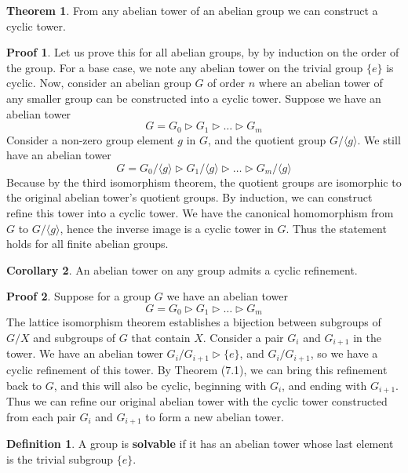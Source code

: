 \documentclass[12pt]{amsbook}
\theoremstyle{definition}
\newtheorem{theorem}{Theorem}[chapter]
\newtheorem{corollary}[theorem]{Corollary}
\newtheorem{definition}{Definition}
\newtheorem*{prf}{Proof}
\newcommand{\gen}[1]{\langle #1 \rangle} %
\begin{document}
\begin{theorem}
    From any abelian tower of an abelian group we can construct a cyclic tower.
\end{theorem}
\begin{prf}
    Let us prove this for all abelian groups, by by induction on the order of the group. For a base case, we note any abelian tower on the trivial group $\{e\}$ is cyclic. Now, consider an abelian group $G$ of order $n$ where an abelian tower of any smaller group can be constructed into a cyclic tower. Suppose we have an abelian tower
    \[ G = G_0 \rhd G_1 \rhd \dots \rhd G_m \]
    Consider a non-zero group element $g$ in $G$, and the quotient group $G/\gen{g}$. We still have an abelian tower
    \[ G = G_0/\gen{g} \rhd G_1/\gen{g} \rhd \dots \rhd G_m/\gen{g} \]
    Because by the third isomorphism theorem, the quotient groups are isomorphic to the original abelian tower's quotient groups. By induction, we can construct refine this tower into a cyclic tower. We have the canonical homomorphism from $G$ to $G/\gen{g}$, hence the inverse image is a cyclic tower in $G$. Thus the statement holds for all finite abelian groups.
\end{prf}

\begin{corollary}
    An abelian tower on any group admits a cyclic refinement.
\end{corollary}
\begin{prf}
    Suppose for a group $G$ we have an abelian tower
    \[ G = G_0 \rhd G_1 \rhd \dots \rhd G_m \]
    The lattice isomorphism theorem establishes a bijection between subgroups of $G/X$ and subgroups of $G$ that contain $X$. Consider a pair $G_i$ and $G_{i+1}$ in the tower. We have an abelian tower $G_i/G_{i+1} \rhd \{e\}$, and $G_i/G_{i+1}$, so we have a cyclic refinement of this tower. By Theorem (7.1), we can bring this refinement back to $G$, and this will also be cyclic, beginning with $G_i$, and ending with $G_{i+1}$. Thus we can refine our original abelian tower with the cyclic tower constructed from each pair $G_i$ and $G_{i+1}$ to form a new abelian tower.
\end{prf}

\begin{definition}
    A group is {\bf solvable}  if it has an abelian tower whose last element is the trivial subgroup $\{e\}$.
\end{definition}
\end{document}
